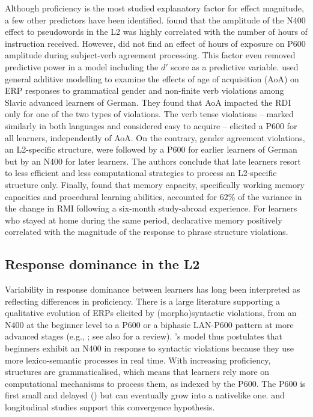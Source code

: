 \documentclass[output=paper,colorlinks,citecolor=brown,modfonts,nonflat]{../langscibook}
\begin{document}
Although proficiency is the most studied explanatory factor for effect magnitude, a few other predictors have been identified. \citet{McLaughlinEtAl2004} found that the amplitude of the N400 effect to pseudowords in the L2 was highly correlated with the number of hours of instruction received. However, \citet{TannerEtAl2013} did not find an effect of hours of exposure on P600 amplitude during subject-verb agreement processing. This factor even removed predictive power in a model including the $d′$ score as a predictive variable. \citet{MeulmanEtAl2015} used general additive modelling to examine the effects of age of acquisition (AoA) on ERP responses to grammatical gender and non-finite verb violations among Slavic advanced learners of German. They found that AoA impacted the RDI only for one of the two types of violations. The verb tense violations – marked similarly in both languages and considered easy to acquire – elicited a P600 for all learners, independently of AoA. On the contrary, gender agreement violations, an L2-specific structure, were followed by a P600 for earlier learners of German but by an N400 for later learners. The authors conclude that late learners resort to less efficient and less computational strategies to process an L2-specific structure only. Finally, \citet{Faretta-StutenbergMorgan-Short2018} found that memory capacity, specifically working memory capacities and procedural learning abilities, accounted for 62\% of the variance in the change in RMI following a six-month study-abroad experience. For learners who stayed at home during the same period, declarative memory positively correlated with the magnitude of the response to phrase structure violations.

\subsection{Response dominance in the L2}

Variability in response dominance between learners has long been interpreted as reflecting differences in proficiency. There is a large literature supporting a qualitative evolution of ERPs elicited by (morpho)syntactic violations, from an N400 at the beginner level to a P600 or a biphasic LAN-P600 pattern at more advanced stages (e.g., \citealt{OsterhoutEtAl2006,RossiEtAl2006,Kotz2009,McLaughlinEtAl2010}; see also \citealt{Steinhauer2014} for a review). \citet{SteinhauerEtAl2009}’s model thus postulates that beginners exhibit an N400 in response to syntactic violations because they use more lexico-semantic processes in real time. With increasing proficiency, structures are grammaticalised, which means that learners rely more on computational mechanisms to process them, as indexed by the P600. The P600 is first small and delayed (\citealt{TokowiczMacWhinney2005,RossiEtAl2006}) but can eventually grow into a nativelike one.  and  longitudinal studies support this convergence hypothesis.
\end{document}
